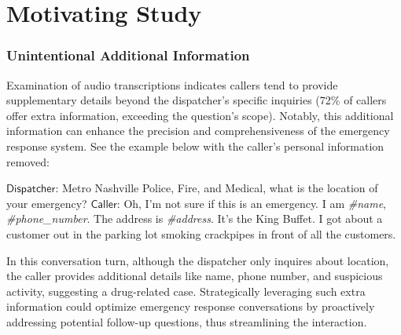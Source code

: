 \section{Motivating Study} 



\subsubsection{Unintentional Additional Information}

 Examination of audio transcriptions indicates callers tend to provide supplementary details beyond the dispatcher's specific inquiries (72\% of callers offer extra information, exceeding the question's scope). Notably, this additional information can enhance the precision and comprehensiveness of the emergency response system. See the example below with the caller's personal information removed: 

$\mathsf{Dispatcher}$: Metro Nashville Police, Fire, and Medical, what is the location of your emergency? $\mathsf{Caller}$: Oh, I'm not sure if this is an emergency. I am \textit{\#name}, \textit{\#phone\_number}. The address is \textit{\#address}. It's the King Buffet. I got about a customer out in the parking lot smoking crackpipes in front of all the customers. 



In this conversation turn, although the dispatcher only inquires about location, the caller provides additional details like name, phone number, and suspicious activity, suggesting a drug-related case. Strategically leveraging such extra information could optimize emergency response conversations by proactively addressing potential follow-up questions, thus streamlining the interaction. 

